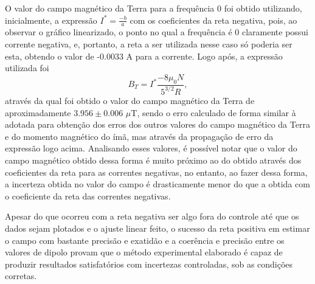 O valor do campo magnético da Terra para a frequência 0 foi obtido utilizando, inicialmente, a expressão $I^* = \frac{-b}{a}$ com os coeficientes da reta negativa, pois, ao observar o gráfico linearizado, o ponto no qual a frequência é 0 claramente possui corrente negativa, e, portanto, a reta a ser utilizada nesse caso só poderia ser esta, obtendo o valor de -0.0033 A para a corrente. Logo após, a expressão utilizada foi
\begin{equation}
    B_T=I^*\frac{-8 \mu_{0} N}{5^{3 / 2} R},
    \label{eq3}
\end{equation}
através da qual foi obtido o valor do campo magnético da Terra de aproximadamente $3.956 \pm 0.006$ $\mu$T, sendo o erro calculado de forma similar à adotada para obtenção dos erros dos outros valores do campo magnético da Terra e do momento magnético do ímã, mas através da propagação de erro da expressão logo acima. Analisando esses valores, é possível notar que o valor do campo magnético obtido dessa forma é muito próximo ao do obtido através dos coeficientes da reta para as correntes negativas, no entanto, ao fazer dessa forma, a incerteza obtida no valor do campo é drasticamente menor do que a obtida com o coeficiente da reta das correntes negativas.

Apesar do que ocorreu com a reta negativa ser algo fora do controle até que os dados sejam plotados e o ajuste linear feito, o sucesso da reta positiva em estimar o campo com bastante precisão e exatidão e a coerência e precisão entre os valores de dipolo provam que o método experimental elaborado é capaz de produzir resultados satisfatórios com incertezas controladas, sob as condições corretas.